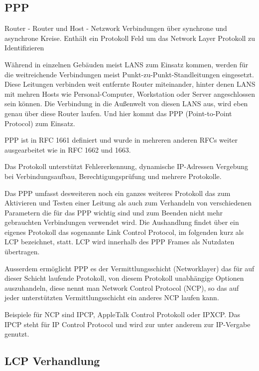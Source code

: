 \documentclass[12pt, a4paper, ngerman]{article}
\begin{document}
\subsection{PPP}
Router - Router und Host - Netzwork Verbindungen über synchrone und asynchrone Kreise. Enthält ein Protokoll Feld um das Network Layer Protokoll zu Identifizieren \cite[S. 102]{SWB-107223570}  

Während in einzelnen Gebäuden meist LANS zum Einsatz kommen, werden für die weitreichende Verbindungen meist Punkt-zu-Punkt-Standleitungen eingesetzt. Diese Leitungen verbinden weit entfernte Router miteinander, hinter denen LANS mit mehren Hosts wie Personal-Computer, Workstation oder Server angeschlossen sein können. Die Verbindung in die Außenwelt von diesen LANS aus, wird eben genau über diese Router laufen. Und hier kommt das PPP (Point-to-Point Protocol) zum Einsatz.

PPP ist in RFC 1661 definiert und wurde in mehreren anderen RFCs weiter ausgearbeitet wie in RFC 1662 und 1663.

Das Protokoll unterstützt Fehlererkennung, dynamische IP-Adressen Vergebung bei Verbindungsaufbau, Berechtigungsprüfung und mehrere Protokolle.

Das PPP umfasst desweiteren noch ein ganzes weiteres Protokoll das zum Aktivieren und Testen einer Leitung als auch zum Verhandeln von verschiedenen Parametern die für das PPP wichtig sind und zum Beenden nicht mehr gebrauchten Verbindungen verwendet wird. Die Aushandlung findet über ein eigenes Protokoll das sogenannte Link Control Protocol, im folgenden kurz als LCP bezeichnet, statt. LCP wird innerhalb des PPP Frames als Nutzdaten übertragen.

Ausserdem ermöglicht PPP es der Vermittlungsschicht (Networklayer) das für auf dieser Schicht laufende Protokoll, von diesem Protokoll unabhängige Optionen auszuhandeln, diese nennt man Network Control Protocol (NCP), so das auf jeder unterstützten Vermittlungsschicht ein anderes NCP laufen kann. 

Beispiele für NCP sind IPCP, AppleTalk Control Protokoll oder IPXCP. Das IPCP steht für IP Control Protocol und wird zur unter anderem zur IP-Vergabe genutzt.


\subsection{LCP Verhandlung}
\end{document}

